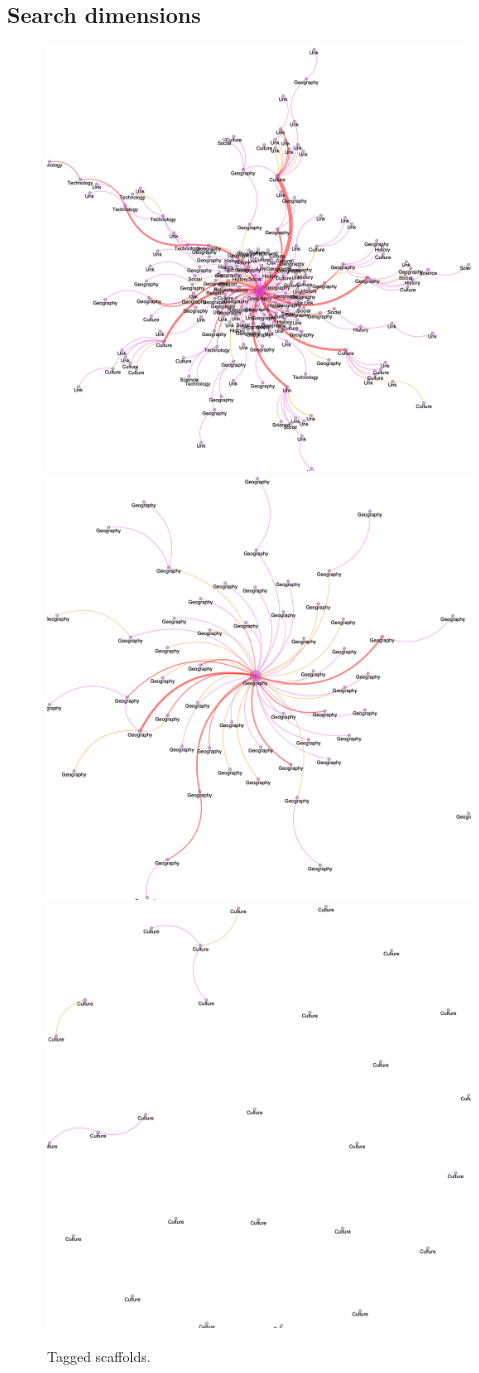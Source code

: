 \documentclass[fleqn,10pt]{wlscirep}
\begin{document}

\subsection*{Search dimensions}
\begin{figure}[H]
\centering
\includegraphics[width=0.32\linewidth]{figs/mysql_Mursuka_reduced_tags.jpg}
\includegraphics[width=0.32\linewidth]{figs/mysql_Mursuka_reduced_tagsub_geo.jpg}
\includegraphics[width=0.32\linewidth]{figs/mysql_Mursuka_reduced_tagsub_cult.jpg}
\caption{Tagged scaffolds.}
\label{fig:scaftag}
\end{figure}
\end{document}
